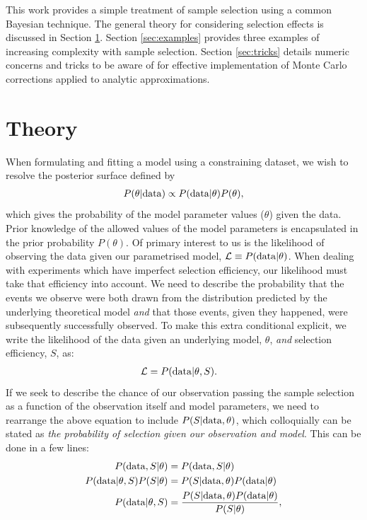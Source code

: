 \documentclass[a4paper,fleqn,usenatbib]{mnras}
\begin{document}
This work provides a simple treatment of sample selection using a common Bayesian technique. The general theory for considering selection effects is discussed in Section \ref{sec:theory}. Section \ref{sec:examples} provides three examples of increasing complexity with sample selection. Section \ref{sec:tricks} details numeric concerns and tricks to be aware of for effective implementation of Monte Carlo corrections applied to analytic approximations.






\section{Theory}
\label{sec:theory}

When formulating and fitting a model using a constraining dataset, we wish to resolve the posterior surface defined by
\begin{align}
P(\theta | {\rm data}) \propto P({\rm data} | \theta) P(\theta),
\end{align}
which gives the probability of the model parameter values ($\theta$) given the data.  Prior knowledge of the allowed values of the model parameters is encapsulated in the prior probability $P(\theta)$. Of primary interest to us is the likelihood of observing the data given our parametrised model, $\mathcal{L} \equiv P({\rm data} | \theta)$. When dealing with experiments which have imperfect selection efficiency, our likelihood must take that efficiency into account.  We need to describe the probability that the events we observe were both drawn from the distribution predicted by the underlying theoretical model \textit{and} that those events, given they happened, were subsequently successfully observed.  To make this extra conditional explicit, we write the likelihood of the data given an underlying model, $\theta$, \textit{and} selection efficiency, $S$, as:
\begin{align}
\mathcal{L} &= P({\rm data} | \theta, S). \label{eq:like}
\end{align}
If we seek to describe the chance of our observation passing the sample selection as a function of the observation itself and model parameters, we need to rearrange the above equation to include $P(S|{\rm data},\theta)$, which colloquially can be stated as \textit{the probability of selection given our observation and model}. This can be done in a few lines:
\begin{align}
P({\rm data}, S | \theta) &= P({\rm data}, S | \theta) \\
P({\rm data} | \theta, S) P(S | \theta)  &= P(S | {\rm data}, \theta) P({\rm data} | \theta)  \\
P({\rm data} | \theta, S) &= \frac{P(S | {\rm data}, \theta) P({\rm data} | \theta) }{P(S | \theta)},
\end{align}
\end{document}
